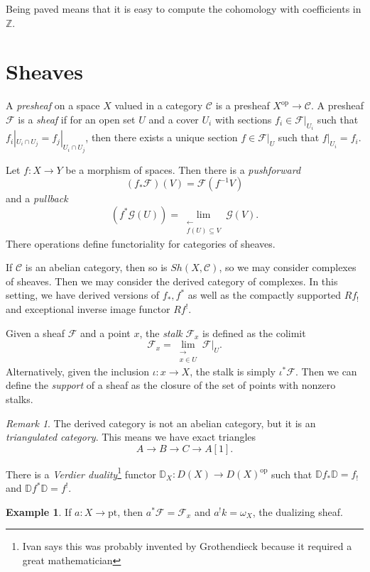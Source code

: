 \documentclass[leqno, openany]{memoir}
\theoremstyle{definition}
\newtheorem{exm}[thm]{Example}
\theoremstyle{remark}
\newtheorem{rmk}[thm]{Remark}
\theoremstyle{plain}
\theoremstyle{definition}
\theoremstyle{remark}
\newcommand{\Z}{\mathbb{Z}}
\newcommand{\mc}[1]{\mathcal{#1}}
\newcommand{\mb}[1]{\mathbb{#1}}
\newcommand{\mr}[1]{\mathrm{#1}}
\begin{document}
Being paved means that it is easy to compute the cohomology with coefficients
in $\Z$.

\section{Sheaves}%

A \textit{presheaf} on a space $X$ valued in a category $\mc{C}$ is a presheaf
$X^{\mr{op}} \to \mc{C}$. A presheaf $\mc{F}$ is a \textit{sheaf} if for an
open set $U$ and a cover $U_i$ with sections $f_i \in \mc{F}|_{U_i}$ such that
$f_i |_{U_i \cap U_j} = f_j |_{U_i \cap U_j}$, then there exists a unique
section $f \in \mc{F}|_{U}$ such that $f|_{U_i} = f_i$.

Let $f:X \to Y$ be a morphism of spaces. Then there is a \textit{pushforward}
\[ (f_* \mc{F}) (V) = \mc{F}(f^{-1} V) \] and a \textit{pullback} \[ (f^*
\mc{G} (U)) = \lim_{\substack{\gets \\ f(U) \subseteq V}} \mc{G}(V). \] There
operations define functoriality for categories of sheaves.

If $\mc{C}$ is an abelian category, then so is $Sh(X, \mc{C})$, so we may
consider complexes of sheaves. Then we may consider the derived category of
complexes. In this setting, we have derived versions of $f_*, f^*$ as well as
the compactly supported $Rf_!$ and exceptional inverse image functor $Rf^!$.

Given a sheaf $\mc{F}$ and a point $x$, the \textit{stalk} $\mc{F}_x$ is
defined as the colimit \[ \mc{F}_x = \lim_{\substack{\to \\ x \in U}}
\mc{F}|_{U}. \] Alternatively, given the inclusion $\iota: x \to X$, the stalk
is simply $\iota^* \mc{F}$. Then we can define the \textit{support} of a sheaf
as the closure of the set of points with nonzero stalks.

\begin{rmk} The derived category is not an abelian category, but it is an
    \textit{triangulated category}. This means we have exact triangles \[ A \to
    B \to C \to A[1]. \] \end{rmk}

There is a \textit{Verdier duality}\footnote{Ivan says this was probably
invented by Grothendieck because it required a great mathematician} functor
$\mb{D}_X: D(X) \to D(X)^{\mr{op}}$ such that $\mb{D}f_* \mb{D} = f_!$ and
$\mb{D} f^* \mb{D} = f^!$.

\begin{exm} If $a: X \to \mr{pt}$, then $a^* \mc{F} = \mc{F}_x$ and $a^! k =
\omega_X$, the dualizing sheaf.  \end{exm}
\end{document}
